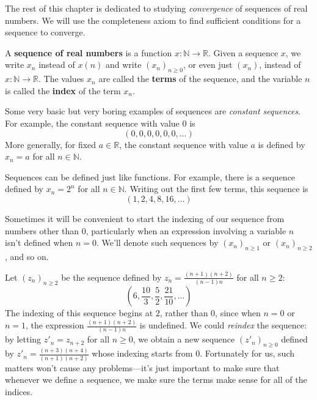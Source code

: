 The rest of this chapter is dedicated to studying \textit{convergence} of sequences of real numbers. We will use the completeness axiom to find sufficient conditions for a sequence to converge.

\begin{definition}
\label{defSequence}
A \textbf{sequence of real numbers} is a function $x : \mathbb{N} \to \mathbb{R}$. Given a sequence $x$, we write $x_n$ instead of $x(n)$ and write $(x_n)_{n \ge 0}$, or even just $(x_n)$, instead of $x : \mathbb{N} \to \mathbb{R}$. The values $x_n$ are called the \textbf{terms} of the sequence, and the variable $n$ is called the \textbf{index} of the term $x_n$.
\end{definition}

\begin{example}
\label{exConstantSequence}
Some very basic but very boring examples of sequences are \textit{constant sequences}. For example, the constant sequence with value $0$ is
\[ (0,0,0,0,0,0,\dots) \]
More generally, for fixed $a \in \mathbb{R}$, the constant sequence with value $a$ is defined by $x_n=a$ for all $n \in \mathbb{N}$.
\end{example}

\begin{example}
\label{exSequencePowersOfTwo}
Sequences can be defined just like functions. For example, there is a sequence defined by $x_n = 2^n$ for all $n \in \mathbb{N}$. Writing out the first few terms, this sequence is
\[ (1,2,4,8,16,\dots) \]
\end{example}

Sometimes it will be convenient to start the indexing of our sequence from numbers other than $0$, particularly when an expression involving a variable $n$ isn't defined when $n=0$. We'll denote such sequences by $(x_n)_{n \ge 1}$ or $(x_n)_{n \ge 2}$, and so on.

\begin{example}
Let $(z_n)_{n \ge 2}$ be the sequence defined by $z_n = \frac{(n+1)(n+2)}{(n-1)n}$ for all $n \ge 2$:
\[ \left(6, \frac{10}{3}, \frac{5}{2}, \frac{21}{10}, \dots \right) \]
The indexing of this sequence begins at $2$, rather than $0$, since when $n=0$ or $n=1$, the expression $\frac{(n+1)(n+2)}{(n-1)n}$ is undefined. We could \textit{reindex} the sequence: by letting $z'_n = z_{n+2}$ for all $n \ge 0$, we obtain a new sequence $(z'_n)_{n \ge 0}$ defined by $z'_n = \frac{(n+3)(n+4)}{(n+1)(n+2)}$ whose indexing starts from $0$. Fortunately for us, such matters won't cause any problems---it's just important to make sure that whenever we define a sequence, we make sure the terms make sense for all of the indices.
\end{example}

